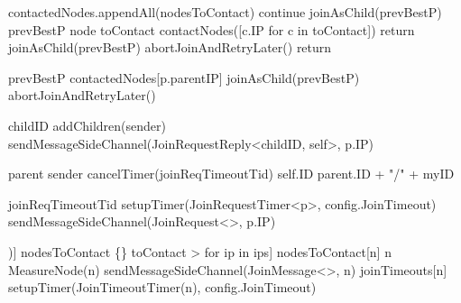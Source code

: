 \begin{algorithm}{}
\begin{algorithmic}[1]
 \label{alg:memb:join:cond_go}
    \State contactedNodes.appendAll(nodesToContact)
         \label{alg:memb:join:verif_children}
            \State continue 
        \EndIf
         \label{alg:memb:join:verif_vs_prev}
            \State joinAsChild(prevBestP)
        \Else
            \State prevBestP \asdassign node \label{alg:memb:join:advance}
            \State toContact 
            \State contactNodes([c.IP for c in toContact])
        \EndIf
        \State return
    \EndFor
    {joinAsChild(prevBestP)}  
    {abortJoinAndRetryLater()} \label{alg:memb:join:join_base_case}
    \State return
\asdend

 \label{alg:memb:join:exclusions}
\asdend

            \State prevBestP \asdassign contactedNodes[p.parentIP]
            \State joinAsChild(prevBestP)
        \Else
            \State abortJoinAndRetryLater()
        \EndIf
    \EndIf
\asdend

    \State childID \asdassign addChildren(sender) 
    \State sendMessageSideChannel(JoinRequestReply<childID, self>, p.IP)
\asdend
    
        \State parent \asdassign sender 
        \State cancelTimer(joinReqTimeoutTid)
        \State self.ID \asdassign parent.ID + "/" + myID 
    \EndIf
\asdend

    \State joinReqTimeoutTid \asdassign setupTimer(JoinRequestTimer<p>, config.JoinTimeout)
    \State sendMessageSideChannel(JoinRequest<>, p.IP)
\asdend

\asdprocedure[contactNodes(ips : IP[])]
    \State nodesToContact \asdassign \{\}
    \State toContact \asdassign [Node<0,nil,0,false,lIP,false,[]> for ip in ips]
        \State nodesToContact[n] \asdassign n
        \State MeasureNode(n) 
        \State sendMessageSideChannel(JoinMessage<>, n)
        \State joinTimeouts[n] \asdassign \asdassign setupTimer(JoinTimeoutTimer(n), config.JoinTimeout)
    \EndFor
\asdend

\end{algorithmic}
\end{algorithm}

